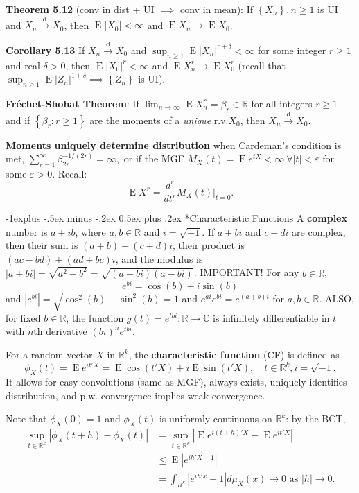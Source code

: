 \documentclass[paper=letter,fontsize=3mm]{scrartcl}
\makeatletter
\DeclareMathOperator{\E}{E}
\newcommand{\convdist}{\stackrel{\text{d}}{\longrightarrow}}
\newcommand{\eps}{\varepsilon}
\newcommand{\R}{\mathbb{R}}
\newcommand{\C}{\mathbb{C}}
\newcommand\abs[1]{\left| #1 \right|}
\newcommand\set[1]{\left\{ #1 \right\}}
\renewcommand{\subsection}{\@startsection{subsection}{2}{0mm}%
                                {-1explus -.5ex minus -.2ex}%
                                {0.5ex plus .2ex}%
                                {\normalfont\normalsize\bfseries}}
\makeatother
\begin{document}
\begin{multicols*}{3}
\textbf{Theorem 5.12} (conv in dist + UI $\implies$ conv in mean): If $\set{X_n}, n\ge1$ is UI and $X_n \convdist X_0$, then $\E\abs{X_0} < \infty$ and $\E X_n \to \E X_0$. \\ \medskip

\textbf{Corollary 5.13}
If $X_n \convdist X_0$ and $\sup_{n\ge1} \E\abs{X_n}^{r+\delta} < \infty$ for some integer $r \ge 1$ and real $\delta > 0$, then $\E\abs{X_0}^r < \infty$ and $\E X_n^r \to \E X_0^r$ (recall that $\sup_{n\ge1} \E\abs{Z_n}^{1+\delta} \implies \set{Z_n}$ is UI). \\ \medskip 

\textbf{Fr\'{e}chet-Shohat Theorem}: If $\lim_{n\to\infty} \E X_n^r = \beta_r \in \R$ for all integers $r \ge 1$ and if $\set{\beta_r: r \ge 1}$ are the moments of a \emph{unique} r.v.\@ $X_0$, then $X_n \convdist X_0$. \\ \medskip

\textbf{Moments uniquely determine distribution} when Cardeman's condition is met, $\sum_{r=1}^\infty \beta_{2r}^{-1/(2r)} = \infty,$ or if the MGF $M_X(t) = \E e^{tX} < \infty ~ \forall \abs{t} < \eps$ for some $\eps > 0$. Recall: $$\E X^r = \frac{d^r}{dt^r} M_X(t) \bigg|_{t=0}.$$

\subsection*{Characteristic Functions}
A \textbf{complex} number is $a + ib$, where $a,b \in \R$ and $i = \sqrt{-1}$. If $a + bi$ and $c + di$ are complex, then their sum is $(a + b) + (c+d)i$, their product is $(ac - bd) + (ad + bc)i$, and the modulus is $\abs{a + bi} = \sqrt{a^2 + b^2} = \sqrt{(a+bi)(a-bi)}$. IMPORTANT! For any $b \in \R$,
$$e^{bi} = \cos(b) + i \sin(b)$$
and $\abs{e^{bi}} = \sqrt{\cos^2(b) + \sin^2(b)} =1$ and $e^{ai}e^{bi} = e^{(a+b)i}$ for $a,b\in\R$. ALSO, for fixed $b \in \R$, the function $g(t) = e^{tbi}: \R \to \C$ is infinitely differentiable in $t$ with $n$th derivative $(bi)^n e^{tbi}$. \\ \medskip

For a random vector $X$ in $\R^k$, the \textbf{characteristic function} (CF) is defined as
$$\phi_X(t) = \E e^{it'X} = \E \cos(t'X) + i \E \sin(t'X), \quad t\in \R^k, i = \sqrt{-1}.$$
It allows for easy convolutions (same as MGF), always exists, uniquely identifies distribution, and p.w. convergence implies weak convergence. \\ \medskip

Note that $\phi_X(0) = 1$ and $\phi_X(t)$ is uniformly continuous on $\R^k$: by the BCT,
\begin{align*}
\sup_{t\in\R^k} \abs{\phi_X(t+h) - \phi_X(t)}
&=  \sup_{t\in\R^k} \abs{\E e^{i(t+h)'X} - \E e^{it'X}} \\
&\le \E \abs{e^{ih'X - 1}} \\
&= \int_{R^k} \abs{e^{ih'x} - 1} d\mu_X(x) \to 0 \text{ as } \abs{h} \to 0.
\end{align*}


\end{multicols*}
\end{document}
